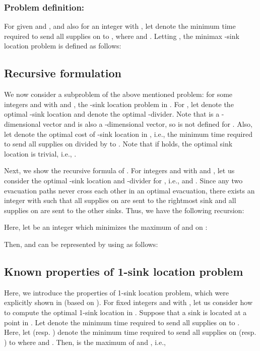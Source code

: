 \documentclass[a4paper]{llncs}
\begin{document}
\subsubsection{Problem definition:}
For given  and ,
and also for an integer  with , let  denote the minimum time required to send all supplies on  to , where  and .
Letting , the minimax -sink location problem is defined as follows:







\subsection{Recursive formulation}
We now consider a subproblem of the above mentioned problem:
for some integers  and  with  and , the -sink location problem in .
For , let  denote the optimal -sink location and  denote the optimal -divider.
Note that  is a -dimensional vector and  is also a -dimensional vector,
so  is not defined for .
Also, let  denote the optimal cost of -sink location in , 
i.e., the minimum time required to send all supplies on  divided by  to .
Note that if  holds, the optimal sink location is trivial, i.e., .

Next, we show the recursive formula of .
For integers  and  with  and ,
let us consider the optimal -sink location and -divider for , i.e.,  and .
Since any two evacuation paths never cross each other in an optimal evacuation,
there exists an integer  with  such that
all supplies on  are sent to the rightmost sink
and all supplies on  are sent to the other  sinks.
Thus, we have the following recursion: 

Here, let  be an integer which minimizes the maximum of  and  on :

Then,  and  can be represented by using  as follows:






\subsection{Known properties of 1-sink location problem}
Here, we introduce the properties of 1-sink location problem, which were explicitly shown in \cite{hgk14_2} (based on \cite{chknsx13,hacgknsx14}). 
For fixed integers  and  with , let us consider how to compute the optimal 1-sink location in .
Suppose that a sink is located at a point  in .
Let  denote the minimum time required to send all supplies on  to .
Here, let  (resp. ) denote the minimum time required to send all supplies on  (resp. ) to  where  and .
Then,  is the maximum of  and ,
i.e., 
\end{document}

